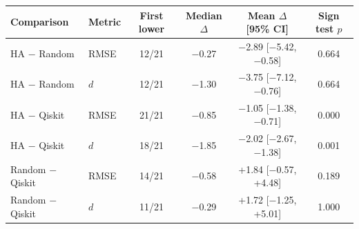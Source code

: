 \begin{tabular}{@{}llcccc@{}}
\toprule
Comparison & Metric & First lower & Median $\Delta$ & Mean $\Delta$ [95\% CI] & Sign test $p$ \\
\midrule
HA $-$ Random & RMSE & 12/21 & $-$0.27 & $-$2.89 [$-$5.42, $-$0.58] & 0.664 \\
HA $-$ Random & $d$ & 12/21 & $-$1.30 & $-$3.75 [$-$7.12, $-$0.76] & 0.664 \\
HA $-$ Qiskit & RMSE & 21/21 & $-$0.85 & $-$1.05 [$-$1.38, $-$0.71] & 0.000 \\
HA $-$ Qiskit & $d$ & 18/21 & $-$1.85 & $-$2.02 [$-$2.67, $-$1.38] & 0.001 \\
Random $-$ Qiskit & RMSE & 14/21 & $-$0.58 & +1.84 [$-$0.57, +4.48] & 0.189 \\
Random $-$ Qiskit & $d$ & 11/21 & $-$0.29 & +1.72 [$-$1.25, +5.01] & 1.000 \\
\bottomrule
\end{tabular}
